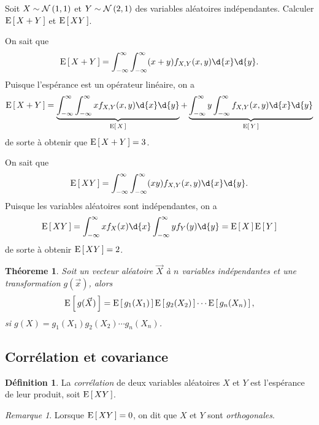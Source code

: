 \documentclass[11pt]{article}
\makeatletter
\newcommand\Norm[2]{%
	\ensuremath{%
		\mathcal{N}\left(#1,#2\right)%
	}%
}%
\newcommand\Esp[1]{%
	\ensuremath{%
		\mathrm{E}\left[\,#1\,\right]%
	}%
}%
\newtheorem{theoreme}{Théoreme}[section]
\theoremstyle{remark}
\newtheorem*{remark}{Remarque}
\theoremstyle{definition}
\newtheorem*{@definition}{Définition}
\newenvironment{definition}{%
	\begin{@definition}%
}{%
	\end{@definition}%
	\setcounter{property}{0}%
}
\makeatother
\begin{document}
\pagebreak
\begin{exemple}
	Soit $X\sim\Norm{1}{1}$ et $Y\sim\Norm{2}{1}$ des variables aléatoires
	indépendantes. Calculer $\Esp{X+Y}$ et $\Esp{XY}$.

	On sait que
	\begin{equation*}
		\Esp{X+Y}
		=\int_{-\infty}^\infty\int_{-\infty}^\infty(x+y)f_{X,Y}(x,y)\d{x}\d{y}.
	\end{equation*}
	Puisque l'espérance est un opérateur linéaire, on a
	\begin{equation*}
		\Esp{X+Y}
		=\underbrace{\int_{-\infty}^\infty\int_{-\infty}^\infty
		 xf_{X,Y}(x,y)\d{x}\d{y}}_{\Esp{X}}
		+\underbrace{\int_{-\infty}^\infty
		 y\int_{-\infty}^\infty f_{X,Y}(x,y)\d{x}\d{y}}_{\Esp{Y}}
	\end{equation*}
	de sorte à obtenir que $\Esp{X+Y}=3$.
\end{exemple}
\addtocounter{exemple}{-1}
\begin{exemple}[suite]
	On sait que
	\begin{equation*}
		\Esp{XY}
		=\int_{-\infty}^\infty\int_{-\infty}^\infty(xy)f_{X,Y}(x,y)\d{x}\d{y}.
	\end{equation*}
	Puisque les variables aléatoires sont indépendantes, on a
	\begin{equation*}
		\Esp{XY}
		=\int_{-\infty}^\infty xf_X(x)\d{x}\int_{-\infty}^\infty yf_Y(y)\d{y}
		=\Esp{X}\Esp{Y}
	\end{equation*}
	de sorte à obtenir $\Esp{XY}=2$.
\end{exemple}

\begin{theoreme}
	Soit un vecteur aléatoire $\vec{X}$ à $n$ variables indépendantes et une
	transformation $g(\vec{x})$, alors
	\begin{equation*}
		\Esp{g(\vec{X})}=\Esp{g_1(X_1)}\Esp{g_2(X_2)}\cdots\Esp{g_n(X_n)},
	\end{equation*}
	si $g(X)=g_1(X_1)g_2(X_2)\cdots g_n(X_n)$.
\end{theoreme}

\subsection{Corrélation et covariance}
\begin{definition}
	La \textit{corrélation} de deux variables aléatoires $X$ et $Y$ est
	l'espérance de leur produit, soit $\Esp{XY}$.
\end{definition}

\begin{remark}
	Lorsque $\Esp{XY}=0$, on dit que $X$ et $Y$ sont \textit{orthogonales}.
\end{remark}
\end{document}
